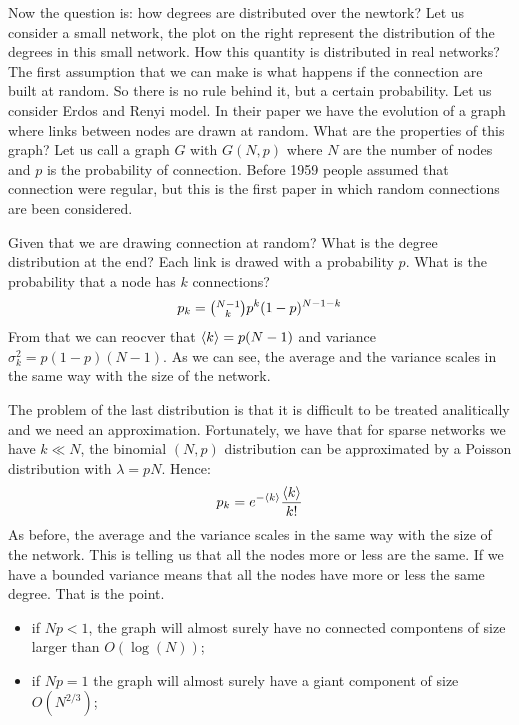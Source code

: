 \documentclass[../main/main.tex]{subfiles}
\begin{document}
Now the question is: how degrees are distributed over the newtork? Let us consider a small network, the plot on the right represent the distribution of the degrees in this small network. How this quantity is distributed in real networks?
The first assumption that we can make is what happens if the connection are built at random. So there is no rule behind it, but a certain probability.
Let us consider Erdos and Renyi model. In their paper we have the evolution of a graph where links between nodes are drawn at random. What are the properties of this graph?
Let us call a graph \( G \) with \( G(N,p) \) where \( N \) are the number of nodes and \( p \) is the probability of connection.
Before 1959 people assumed that connection were regular, but this is the first paper in which random connections are been considered.

Given that we are drawing connection at random? What is the degree distribution at the end? Each link is drawed with a probability \( p \). What is the probability that a node has \( k \) connections?
\begin{equation*}
  p_k = \qty(\substack{N-1 \\ k} ) p^k (1-p)^{N-1-k}
\end{equation*}
From that we can reocver that \( \expval{k} = p(N-1)  \) and variance \( \sigma _k^2 = p(1-p)(N-1) \). As we can see, the average and the variance scales in the same way with the size of the network.

The problem of the last distribution is that it is difficult to be treated analitically and we need an approximation. Fortunately, we have that for sparse networks we have \( k \ll N \), the binomial \( (N,p) \) distribution can be approximated by a Poisson distribution with \( \lambda = p N \). Hence:
\begin{equation*}
  p_k = e^{- \expval{k} } \frac{\expval{k} }{k!}
\end{equation*}
As before, the average and the variance scales in the same way with the size of the network. This is telling us that all the nodes more or less are the same. If we have a bounded variance means that all the nodes have more or less the same degree. That is the point.

\begin{itemize}
\item if \( N p < 1 \), the graph will almost surely have no connected compontens of size larger than \( O(\log(N)) \);
\item if \( N p = 1 \) the graph will almost surely have a giant component of size \( O(N^{2/3}) \);
\end{itemize}
\end{document}
